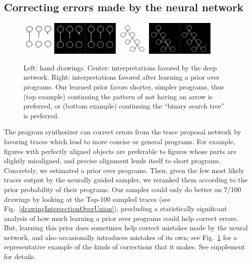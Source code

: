 \documentclass{article}
\newcommand{\probability}{\mathds{P}} %
\begin{document}
\subsection{Correcting errors made by the neural network}\label{synthesizerHelpsParsing}
\begin{figure}\vspace{-0.5cm}
  \includegraphics[width = 5cm]{figures/programSuccess7.png}
  \includegraphics[width = 5cm]{figures/programSuccess16.png}
  \caption{Left: hand drawings. Center: interpretations favored by the deep network. Right: interpretations favored after learning a prior over programs. Our learned prior favors shorter, simpler programs, thus (top example) continuing the pattern of not having an arrow is preferred, or (bottom example) continuing the ``binary search tree'' is preferred.}\label{exampleOfProgramCorrectingMistake}
  \vspace{-1cm}
  \end{figure}
The program synthesizer can correct errors from the trace proposal network by favoring traces which lead to more
concise or general programs.  For example, figures with perfectly aligned objects are preferable to figures whose parts are slightly misaligned, and precise alignment lends itself to short
programs.  Concretely, we estimated a prior over programs. Then,
given the few most likely traces output by the neurally guided sampler,
we reranked them according to the prior probability of their programs.
Our sampler could only do better on
7/100 drawings by looking at the Top-100 sampled traces
(see Fig.~\ref{drawingIntersectionOverUnion}),
precluding a statistically significant analysis of how much
learning a prior over programs could help correct errors.
But,
learning this prior does sometimes
help correct mistakes made by the neural network, and also
occasionally introduces mistakes of its own; see
Fig.~\ref{exampleOfProgramCorrectingMistake} for a representative
example of the kinds of corrections that it makes.
See supplement for details.



\end{document}
